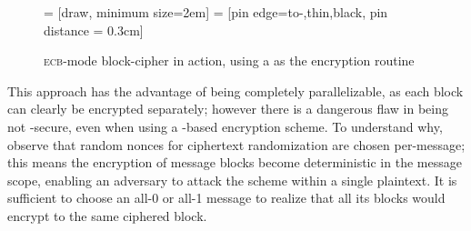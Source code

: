 \begin{figure}[ht]
    \centering

      = [draw, minimum size=2em]
     = [pin edge={to-,thin,black}, pin distance = 0.3cm]

    \caption{\textsc{ecb}-mode block-cipher in action, using a \prf{} as the encryption routine}
    \label{fig:ecb}
\end{figure}

This approach has the advantage of being completely parallelizable, as each block can clearly be encrypted separately; however there is a dangerous flaw in being not \cpa-secure, even when using a \prf-based encryption scheme. To understand why, observe that random nonces for ciphertext randomization are chosen per-message; this means the encryption of message blocks become deterministic in the message scope, enabling an adversary to attack the scheme within a single plaintext. It is sufficient to choose an all-0 or all-1 message to realize that all its blocks would encrypt to the same ciphered block.

